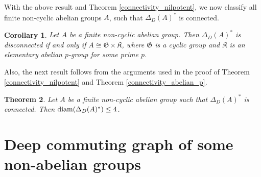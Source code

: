 \documentclass[12pt,a4paper]{article}
\newtheorem{theorem}{Theorem}[section]
\newtheorem{corollary}[theorem]{Corollary}
\begin{document}
With the above result and Theorem \ref{connectivity_nilpotent}, we now classify all finite non-cyclic abelian groups $A$, such that $\Delta_D(A)^*$ is connected. 

\begin{corollary}\label{connectivity_abelian}
Let $A$ be a finite non-cyclic abelian group. Then $\Delta_D(A)^*$ is disconnected if and only if $A\cong \mathfrak{G}\times \mathfrak{K}$, where $\mathfrak{G}$ is a cyclic group and $\mathfrak{K}$ is an elementary abelian $p$-group for some prime $p$.    
\end{corollary}
Also, the next result follows from the arguments used in the proof of Theorem \ref{connectivity_nilpotent} and Theorem \ref{connectivity_abelian_p}.
\begin{theorem}\label{diameter_abelian}
Let $A$ be a finite non-cyclic abelian group such that $\Delta_D(A)^*$ is connected. Then ${\rm diam}(\Delta_D(A)^*)\leq 4$.   
\end{theorem}

\section{Deep commuting graph of some non-abelian groups}\label{Deep commuting graph of some non-abelian groups}
\end{document}
